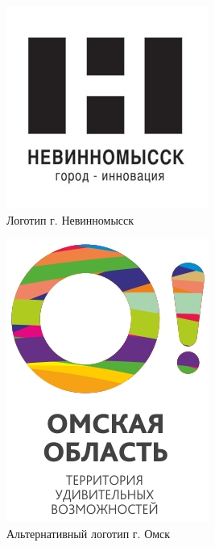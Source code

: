 \begin{figure}[ht]
  \centering
  \includegraphics[width=.3\linewidth]{images/supplement/territorial/nevinnomisk}
  \caption[]{Логотип г. Невинномысск}
  \label{fig:territorial:nevinnomisk}
\end{figure}

\begin{figure}[ht]
  \centering
  \includegraphics[width=.2\linewidth]{images/supplement/territorial/omsk}
  \caption[]{Альтернативный логотип г. Омск}
  \label{fig:territorial:omsk}
\end{figure}
